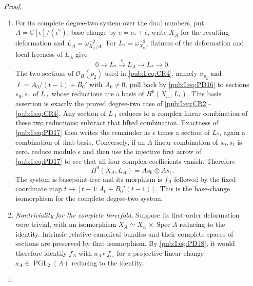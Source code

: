 \begin{proof}
\begin{enumerate}[label=\arabic*.,leftmargin=*]
\item For its complete degree-two system over the dual numbers, put
$A=\mathbb C[\epsilon]/(\epsilon^2)$, base-change by
$c=c_*+\epsilon$, write $X_A$ for the resulting deformation and
$L_A=\omega_{X_A/A}^{-2}$. For $L_*=\omega_{X_{c_*}}^{-2}$,
flatness of the deformation and local freeness of $L_A$ give
\begin{equation}
 0\longrightarrow L_*\xrightarrow{\ \epsilon\ }L_A
        \longrightarrow L_*\longrightarrow0.
\label{pub:I:eq:PD17}
\end{equation}
The two sections of $\mathcal O_B(p_2)$ used in \eqref{pub:I:eq:CR4}, namely
$\sigma_{p_2}$ and $\ell=A_0/(t-1)+B_0'$ with $A_0\ne0$,
pull back by \eqref{pub:I:eq:PD16} to sections $s_0,s_1$ of $L_A$ whose reductions
are a basis of $H^0(X_{c_*},L_*)$. This basis assertion is exactly
the proved degree-two case of \eqref{pub:I:eq:CR2}--\eqref{pub:I:eq:CR4}.
Any section of $L_A$ reduces to a complex linear combination of these
two reductions; subtract that lifted combination. Exactness of \eqref{pub:I:eq:PD17}
then writes the remainder as $\epsilon$ times a section of $L_*$,
again a combination of that basis. Conversely, if an $A$-linear
combination of $s_0,s_1$ is zero, reduce modulo $\epsilon$ and then
use the injective first arrow of \eqref{pub:I:eq:PD17} to see that all four complex
coefficients vanish. Therefore
\begin{equation}
 H^0(X_A,L_A)=A s_0\oplus A s_1.
\label{pub:I:eq:PD18}
\end{equation}
The system is basepoint-free and its morphism is $f_A$ followed by
the fixed coordinate map $t\mapsto[t-1:A_0+B_0'(t-1)]$.
This is the base-change isomorphism for the complete degree-two system.

\item \emph{Nontriviality for the complete threefold.}
Suppose its first-order deformation were trivial, with an isomorphism
$X_A\simeq X_{c_*}\times\operatorname{Spec}A$ reducing to the identity.
Intrinsic relative canonical bundles and their complete spaces of
sections are preserved by that isomorphism. By \eqref{pub:I:eq:PD18}, it would
therefore identify $f_A$ with $a_A\circ f_{c_*}$ for a projective
linear change $a_A\in\operatorname{PGL}_2(A)$ reducing to the identity.


\end{enumerate}
\end{proof}
